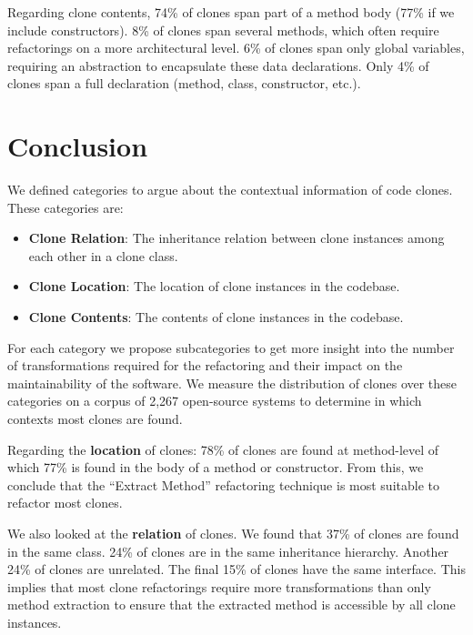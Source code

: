 \documentclass[runningheads]{llncs}
\begin{document}
Regarding clone contents, 74\% of clones span part of a method body (77\% if we include constructors). 8\% of clones span several methods, which often require refactorings on a more architectural level. 6\% of clones span only global variables, requiring an abstraction to encapsulate these data declarations. Only 4\% of clones span a full declaration (method, class, constructor, etc.).

\section{Conclusion}
We defined categories to argue about the contextual information of code clones. These categories are:
\begin{itemize}
  \item \textbf{Clone Relation}: The inheritance relation between clone instances among each other in a clone class.
  \item \textbf{Clone Location}: The location of clone instances in the codebase.
  \item \textbf{Clone Contents}: The contents of clone instances in the codebase.
\end{itemize}
For each category we propose subcategories to get more insight into the number of transformations required for the refactoring and their impact on the maintainability of the software. We measure the distribution of clones over these categories on a corpus of 2,267 open-source systems to determine in which contexts most clones are found.

Regarding the \textbf{location} of clones: 78\% of clones are found at method-level of which 77\% is found in the body of a method or constructor. From this, we conclude that the ``Extract Method'' refactoring technique is most suitable to refactor most clones.

We also looked at the \textbf{relation} of clones. We found that 37\% of clones are found in the same class. 24\% of clones are in the same inheritance hierarchy. Another 24\% of clones are unrelated. The final 15\% of clones have the same interface. This implies that most clone refactorings require more transformations than only method extraction to ensure that the extracted method is accessible by all clone instances.

\printbibliography
\end{document}
